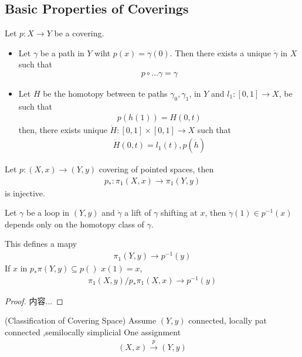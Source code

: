 \documentclass[Total.tex]{subfiles}
\begin{document}
	\subsection{Basic Properties of Coverings}
	\begin{proposition}
		Let $p:X\rightarrow Y$ be a covering. 
		\begin{itemize}
			\item Let $\gamma$ be a path in $Y$ wiht $p(x)=\gamma(0)$. Then there exists a unique $\dot{\gamma}$ in $X$ such that
			\begin{gather*}
				p\circ \dots{\gamma}=\gamma
			\end{gather*}
			\item Let $H$ be the homotopy between te paths $\gamma_0,\gamma_1$, in $Y$ and $l_1:[0,1]\rightarrow X$, be such that
			\begin{gather*}
				p(h(1))=H(0,t)
			\end{gather*}
			then, there exists unique $\dot{H}:[0,1]\times [0,1]\rightarrow X$ such that
			\begin{gather*}
				\dot{H}(0,t)=l_1(t),p(\dot{h})
			\end{gather*}
		\end{itemize}
		
		\begin{corollary}
			Let $p:(X,x)\rightarrow (Y,y)$ covering of pointed spaces, then
			\begin{gather*}
				p_*:\pi_1(X,x)\rightarrow \pi_1(Y,y)
			\end{gather*}
			is injective.
		\end{corollary}
		
		\begin{corollary}
			Let $\gamma$ be a loop in $(Y,y)$ and $\dot{\gamma}$ a lift of $\gamma$ shifting at $x$, then $\dot{\gamma}(1)\in p^{-1}(x)$ depends only on the homotopy class of $\gamma$.
			
			This  defines a mapy
			\begin{gather*}
				\pi_1(Y,y)\rightarrow p^{-1}(y)
			\end{gather*}
			If $x$ in $p_*\pi(Y,y)\subseteq p()$ $x(1)=x$,
			\begin{gather*}
				\pi_1(X,y)/p_*\pi_1(X,x)\rightarrow p^{-1}(y)
			\end{gather*}
		\end{corollary}
		\begin{proof}
			内容...
		\end{proof}
		
		\begin{proposition}
			(Classification of Covering Space) Assume $(Y,y)$ connected, locally pat connected ,semilocally simplicial 
			One assignment
			\begin{gather*}
				(X,x)\stackrel{p}{\rightarrow} (Y,y)
			\end{gather*}
		\end{proposition}
		

\end{proposition}
\end{document}
